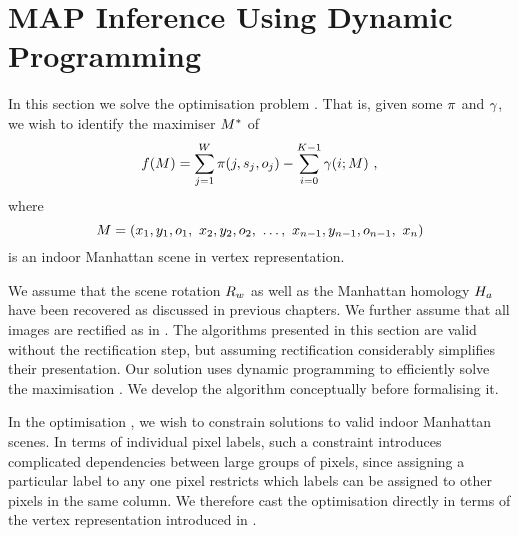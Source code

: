 



\section{MAP Inference Using Dynamic Programming}

In this section we solve the optimisation problem
. That is, given some $\PixelPayoff$ and
$\CornerPenalty$, we wish to identify the maximiser $\OptimalScene$ of
\begin{equation}
  \Objective(\Scene) =
    \sum_{j=1}^{\Width} \PixelPayoff(j,\seam_j,\WallOrient_j) -
    \sum_{i=0}^{\NumWalls-1} \CornerPenalty(i;\Scene) ~,
\end{equation}
where
\begin{equation}
  \Scene =
  ( x_1,y_1,\WallOrient_1,
   ~x_2,y_2,\WallOrient_2,
   ~\ldots,
   ~x_{n-1},y_{n-1},\WallOrient_{n-1}, ~x_n )
\end{equation}
is an indoor Manhattan scene in vertex representation.

We assume that the scene rotation $\SceneR$ as well as the Manhattan
homology $\Hcf$ have been recovered as discussed in
previous chapters. We further assume that all images are rectified
as in . The algorithms presented in this section
are valid without the rectification step, but assuming rectification
considerably simplifies their presentation. Our solution uses dynamic
programming to efficiently solve the maximisation
. We develop the algorithm conceptually before
formalising it.

In the optimisation , we wish to constrain solutions
to valid indoor Manhattan scenes. In terms of individual pixel labels,
such a constraint introduces complicated dependencies between large
groups of pixels, since assigning a particular label to any one pixel
restricts which labels can be assigned to other pixels in the same
column. We therefore cast the optimisation directly in terms of the
vertex representation introduced in .

